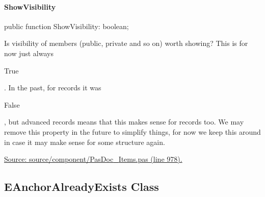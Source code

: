 \documentclass{report}
\newif\ifpdf
\begin{document}
\paragraph*{ShowVisibility}\hspace*{\fill}

\label{PasDoc_Items.TPasCio-ShowVisibility}
\begin{list}{}{
\setlength{\itemindent}{0cm}
\setlength{\listparindent}{0cm}
\setlength{\leftmargin}{\evensidemargin}
\addtolength{\leftmargin}{\tmplength}
\settowidth{\labelsep}{X}
\addtolength{\leftmargin}{\labelsep}
\setlength{\labelwidth}{\tmplength}
}
\item[\textbf{Declaration}\hfill]
\ifpdf
\begin{flushleft}
\fi
\begin{ttfamily}
public function ShowVisibility: boolean;\end{ttfamily}

\ifpdf
\end{flushleft}
\fi

\par
\item[\textbf{Description}]
Is visibility of members (public, private and so on) worth showing? This is for now just always \begin{ttfamily}True\end{ttfamily} . In the past, for records it was \begin{ttfamily}False\end{ttfamily}, but advanced records means that this makes sense for records too. We may remove this property in the future to simplify things, for now we keep this around in case it may make sense for some structure again.\par
\href{https://github.com/pasdoc/pasdoc/blob/master/source/component/PasDoc_Items.pas#L978}{Source: source/component/PasDoc{\_}Items.pas (line 978).}

\end{list}
\ifpdf
\subsection*{\large{\textbf{EAnchorAlreadyExists Class}}\normalsize\hspace{1ex}\hrulefill}
\else
\subsection*{EAnchorAlreadyExists Class}
\fi
\label{PasDoc_Items.EAnchorAlreadyExists}
\end{document}
